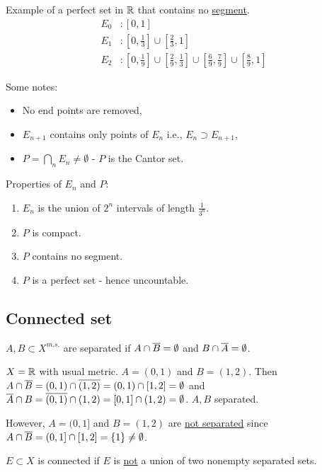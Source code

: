 \documentclass[]{article}
\begin{document}
\begin{definition}
	 Example of a perfect set in $\mathbb{R}$ that contains no \ul{segment}.
	\begin{align*}
		E_0 &: [0,1] \\
		E_1 &: [0,\frac{1}{3}]\cup[\frac{2}{3},1] \\
		E_2 &: [0,\frac{1}{9}]\cup[\frac{2}{9},\frac{1}{3}]\cup[\frac{6}{9}, \frac{7}{9}]\cup [\frac{8}{9},1]
	\end{align*}
	\begin{note}
		Some notes:
		\begin{itemize}
			\item No end points are removed,
			\item $E_{n+1}$ contains only points of $E_n$ i.e., $E_n\supset E_{n+1}$,
			\item $P = \bigcap_n E_n\neq\emptyset$ - $P$ is the Cantor set.
		\end{itemize}
	\end{note}
	Properties of $E_n$ and $P$:
	\begin{enumerate}
		\item $E_n$ is the union of $2^n$ intervals of length $\frac{1}{3^n}$.
		\item $P$ is compact.
		\item $P$ contains no segment.
		\item $P$ is a perfect set - hence uncountable.
	\end{enumerate}
\end{definition}

\subsection{Connected set}

\begin{definition}
	 $A,B\subset X^{m.s.}$ are separated if $A\cap\overline{B}=\emptyset$ and $B\cap\overline{A} = \emptyset$.
\end{definition}
\begin{example}
	$X = \mathbb{R}$ with usual metric. $A = (0,1)$ and $B = (1,2)$. Then $A\cap\overline{B} = (0,1)\cap\overline{(1,2)} = (0,1)\cap[1,2] = \emptyset$ and $\overline{A}\cap B = \overline{(0,1)}\cap(1,2) = [0,1]\cap(1,2) = \emptyset$. $A,B$ separated.
	
	However, $A = (0,1]$ and $B = (1,2)$ are \ul{not separated} since $A\cap\overline{B} = (0,1]\cap[1,2] = \{1\} \neq \emptyset$.
\end{example}
\begin{definition}
	 $E\subset X$ is connected if $E$ is \ul{not} a union of two nonempty separated sets.
\end{definition}
\end{document}
